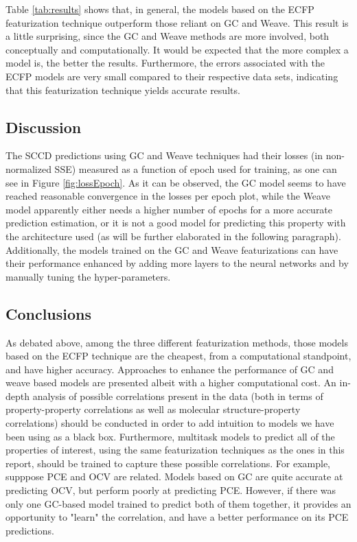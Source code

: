 \documentclass[book.tex]{subfiles}
\begin{document}
Table \ref{tab:results} shows that, in general, the models based on the ECFP featurization technique outperform those reliant on GC and Weave. This result is a little surprising, since the GC and Weave methods are more involved, both conceptually and computationally. It would be expected that the more complex a model is, the better the results. Furthermore, the errors associated with the ECFP models are very small compared to their respective data sets, indicating that this featurization technique yields accurate results. 

\subsection{Discussion}
The SCCD predictions using GC and Weave techniques had their losses (in non-normalized SSE) measured as a function of epoch used for training, as one can see in  Figure \ref{fig:lossEpoch}. As it can be observed, the GC model seems to have reached reasonable convergence in the losses per epoch plot, while the Weave model apparently either needs a higher number of epochs for a more accurate prediction estimation, or it is not a good model for predicting this property with the architecture used (as will be further elaborated in the following paragraph). Additionally, the models trained on the GC and Weave featurizations can have their performance enhanced by adding more layers to the neural networks and by manually tuning the hyper-parameters.

\subsection{Conclusions}
As debated above, among the three different featurization methods, those models based on the ECFP  technique are the cheapest, from a computational standpoint, and have higher accuracy. Approaches to enhance the performance of GC and weave based models are presented albeit with a higher computational cost. An in-depth analysis of possible correlations present in the data (both in terms of property-property correlations as well as molecular structure-property correlations) should be conducted in order to add intuition to models we have been using as a black box. Furthermore, multitask models to predict all of the properties of interest, using the same featurization techniques as the ones in this report, should be trained to capture these possible correlations. For example, supppose PCE and OCV are related. Models based on GC are quite accurate at predicting OCV, but perform poorly at predicting PCE. However, if there was only one GC-based model trained to predict both of them together, it provides an opportunity to "learn" the correlation, and have a better performance on its PCE predictions. 
\end{document}
